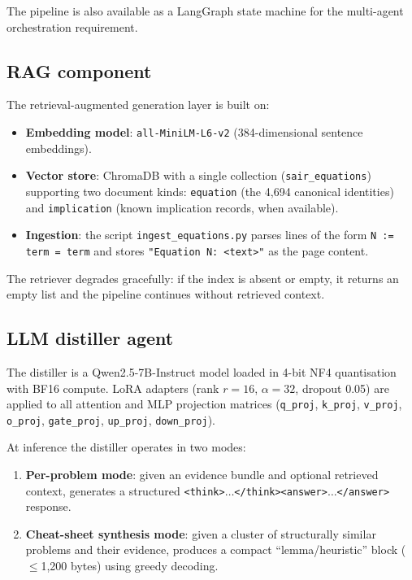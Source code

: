 \documentclass{article}
\begin{document}
The pipeline is also available as a LangGraph state machine for the multi-agent orchestration requirement.

\subsection{RAG component}
\label{sec:rag}

The retrieval-augmented generation layer is built on:
\begin{itemize}[itemsep=1pt]
  \item \textbf{Embedding model}: \texttt{all-MiniLM-L6-v2} (384-dimensional sentence embeddings).
  \item \textbf{Vector store}: ChromaDB with a single collection (\texttt{sair\_equations}) supporting two document kinds: \texttt{equation} (the 4,694 canonical identities) and \texttt{implication} (known implication records, when available).
  \item \textbf{Ingestion}: the script \texttt{ingest\_equations.py} parses lines of the form \texttt{N := term = term} and stores \texttt{"Equation N: <text>"} as the page content.
\end{itemize}

The retriever degrades gracefully: if the index is absent or empty, it returns an empty list and the pipeline continues without retrieved context.

\subsection{LLM distiller agent}
\label{sec:distiller}

The distiller is a Qwen2.5-7B-Instruct model loaded in 4-bit NF4 quantisation with BF16 compute. LoRA adapters (rank $r{=}16$, $\alpha{=}32$, dropout 0.05) are applied to all attention and MLP projection matrices (\texttt{q\_proj}, \texttt{k\_proj}, \texttt{v\_proj}, \texttt{o\_proj}, \texttt{gate\_proj}, \texttt{up\_proj}, \texttt{down\_proj}).

At inference the distiller operates in two modes:
\begin{enumerate}[label=(\roman*),itemsep=1pt]
  \item \textbf{Per-problem mode}: given an evidence bundle and optional retrieved context, generates a structured \texttt{<think>}$\dots$\texttt{</think><answer>}$\dots$\texttt{</answer>} response.
  \item \textbf{Cheat-sheet synthesis mode}: given a cluster of structurally similar problems and their evidence, produces a compact ``lemma/heuristic'' block ($\leq$1,200 bytes) using greedy decoding.
\end{enumerate}
\end{document}
